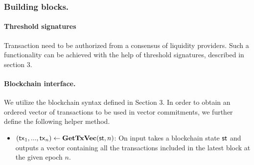 \subsubsection{Building blocks.}
\paragraph*{Threshold signatures}
Transaction need to be authorized from a consensus of liquidity providers. Such a functionality can be achieved with the help of threshold signatures, described in section 3. 
\paragraph*{Blockchain interface.}
We utilize the blockchain syntax defined in Section 3. In order to obtain an ordered vector of transactions to be used in vector commitments, we further define the following helper method.
\begin{itemize}[topsep=0pt, itemsep=0pt, leftmargin=2em]
    \item $(\tx_1, ..., \tx_n) \gets \textbf{GetTxVec}(\st, n)$: On input takes a blockchain state $\st$ and outputs a vector containing all the transactions included in the latest block at the given epoch $n$.
\end{itemize}
